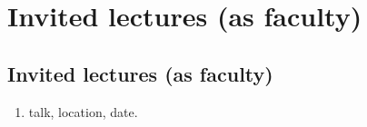\chapter{Invited lectures (as faculty)}
\label{talks}

\section{Invited lectures (as faculty)}

\begin{enumerate}

    \item talk, location, date.
 
\end{enumerate}